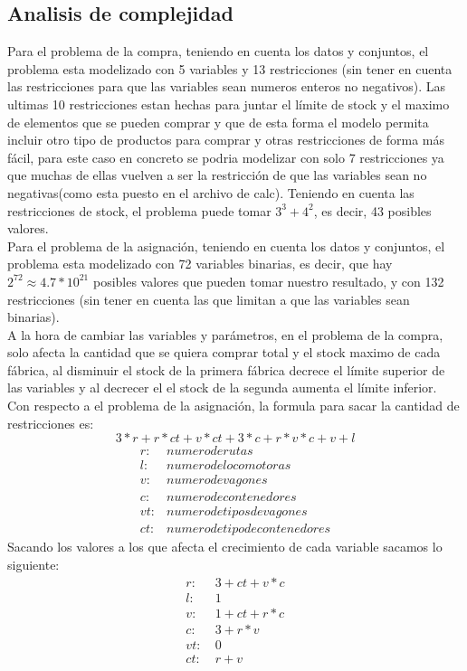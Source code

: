 \documentclass[11pt,spanish]{article}
\begin{document}
		\subsection{Analisis de complejidad}
		Para el problema de la compra, teniendo en cuenta los datos y conjuntos, el problema esta modelizado con 5 variables y 13 restricciones (sin tener en cuenta las restricciones para que las variables sean numeros enteros no negativos). Las ultimas 10 restricciones estan hechas para juntar el límite de stock y el maximo de elementos que se pueden comprar y que de esta forma el modelo permita incluir otro tipo de productos para comprar y otras restricciones de forma más fácil, para este caso en concreto se podria modelizar con solo 7 restricciones ya que muchas de ellas vuelven a ser la restricción de que las variables sean no negativas(como esta puesto en el archivo de calc). Teniendo en cuenta las restricciones de stock, el problema puede tomar $3^3+4^2$, es decir, 43 posibles valores.\\
		Para el problema de la asignación, teniendo en cuenta los datos y conjuntos, el problema esta modelizado con 72 variables binarias, es decir, que hay $2^{72}\approx4.7*10^{21}$ posibles valores que pueden tomar nuestro resultado, y con 132 restricciones (sin tener en cuenta las que limitan a que las variables sean binarias).\\
		A la hora de cambiar las variables y parámetros, en el problema de la compra, solo afecta la cantidad que se quiera comprar total y el stock maximo de cada fábrica, al disminuir el stock de la primera fábrica decrece el límite superior de las variables y al decrecer el el stock de la segunda aumenta el límite inferior. Con respecto a el problema de la asignación, la formula para sacar la cantidad de restricciones es: 
		$$
		3*r+r*ct+v*ct+3*c+r*v*c+v+l
		$$
		\begin{align*}
			r:& numero de rutas\\
			l:& numero de locomotoras\\
			v:& numero de vagones\\
			c:& numero de contenedores\\
			vt:& numero de tipos de vagones\\
			ct:& numero de tipo de contenedores
		\end{align*}
		Sacando los valores a los que afecta el crecimiento de cada variable sacamos lo siguiente:
		\begin{align*}
			r:&\ 3+ct+v*c\\
			l:&\ 1\\
			v:&\ 1+ct+r*c\\
			c:&\ 3+r*v\\
			vt:&\ 0\\
			ct:&\ r+v
		\end{align*}
\end{document}

